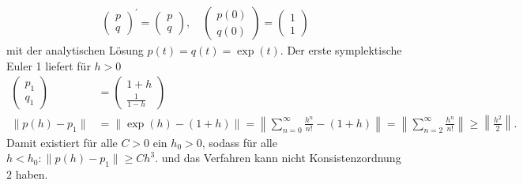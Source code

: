 \begin{solution}
\begin{align*}
  \begin{pmatrix}
    p \\ q
  \end{pmatrix}^{\prime}
  = \begin{pmatrix}
    p \\ q
  \end{pmatrix}, \quad
  \begin{pmatrix}
    p(0) \\ q(0)
  \end{pmatrix} =
  \begin{pmatrix}
    1 \\ 1
  \end{pmatrix}
\end{align*}
mit der analytischen Lösung $p(t) = q(t) = \exp(t)$.
Der erste symplektische Euler 1 liefert für $h > 0$
\begin{align*}
  \begin{pmatrix}
    p_1 \\ q_1
  \end{pmatrix}
  &= \begin{pmatrix}
    1+h \\ \frac{1}{1-h}
  \end{pmatrix} \\
  \|p(h) - p_1\| &= \|\exp(h) - (1+h)\| = \left\|\sum_{n = 0}^{\infty}\frac{h^n}{n!} - (1+h)\right\|
  = \left\|\sum_{n = 2}^{\infty}\frac{h^n}{n!}\right\| \geq \left\|\frac{h^2}{2}\right\|.
\end{align*}
Damit existiert für alle $C > 0$ ein $h_0 > 0$, sodass für alle $h < h_0: \|p(h)-p_1\| \geq Ch^3$.
und das Verfahren kann nicht Konsistenzordnung $2$ haben.
\end{solution}
